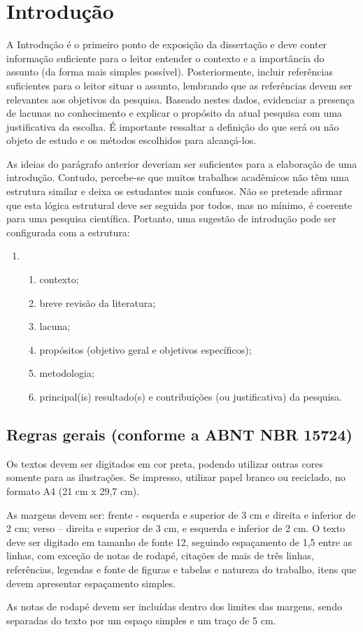 
\chapter{Introdução}

A Introdução é o primeiro ponto de exposição da dissertação e deve conter informação suficiente para o leitor entender o contexto e a importância do assunto (da forma mais simples possível). Posteriormente, incluir referências suficientes para o leitor situar o assunto, lembrando que as referências devem ser relevantes aos objetivos da pesquisa. Baseado nestes dados, evidenciar a presença de lacunas no conhecimento e explicar o propósito da atual pesquisa com uma justificativa da escolha. É importante ressaltar a definição do que será ou não objeto de estudo e os métodos escolhidos para alcançá-los.
 
As ideias do parágrafo anterior deveriam ser suficientes para a elaboração de uma introdução. Contudo, percebe-se que muitos trabalhos acadêmicos não têm uma estrutura similar e deixa os estudantes mais confusos. Não se pretende afirmar que esta lógica estrutural deve ser seguida por todos, mas no mínimo, é coerente para uma pesquisa científica. Portanto, uma sugestão de introdução pode ser configurada com a estrutura:
\begin{enumerate}
	\item[]	
	\begin{enumerate}
		\item contexto;
		\item breve revisão da literatura;
		\item lacuna;
		\item propósitos (objetivo geral e 		objetivos específicos);
		\item metodologia;
		\item principal(is) resultado(s) e 	contribuições (ou justificativa) da pesquisa.
	\end{enumerate}
\end{enumerate}

\section{Regras gerais (conforme a ABNT NBR 15724)}

Os textos devem ser digitados em cor preta, podendo utilizar outras cores somente para as ilustrações. Se impresso, utilizar papel branco ou reciclado, no formato A4 (21 cm x 29,7 cm).

As margens devem ser: frente - esquerda e superior de 3 cm e direita e inferior de 2 cm; verso – direita e superior de 3 cm, e esquerda e inferior de 2 cm. O texto deve ser digitado em tamanho de fonte 12, seguindo espaçamento de 1,5 entre as linhas, com exceção de notas de rodapé, citações de mais de três linhas, referências, legendas e fonte de figuras e tabelas e natureza do trabalho, itens que devem apresentar espaçamento simples.

As notas de rodapé devem ser incluídas dentro dos limites das margens, sendo separadas do texto por um espaço simples e um traço de 5 cm.
